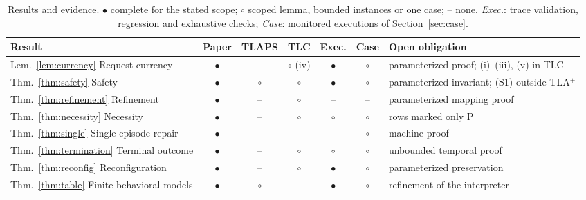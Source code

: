 \documentclass[pdflatex,sn-mathphys-num]{sn-jnl}
\theoremstyle{thmstyleone}%
\theoremstyle{thmstyletwo}%
\theoremstyle{thmstylethree}%
\newcommand{\tla}{TLA$^+$}
\begin{document}
\begin{table}[!ht]
\caption{Results and evidence. $\bullet$ complete for the stated scope; $\circ$ scoped lemma, bounded instances or one case; -- none. \emph{Exec.}: trace validation, regression and exhaustive checks; \emph{Case}: monitored executions of Section~\ref{sec:case}.}\label{tab:evidence}
\footnotesize\setlength{\tabcolsep}{4pt}
\begin{tabular}{@{}lcccccP{33mm}@{}}\toprule
Result & Paper & TLAPS & TLC & Exec. & Case & Open obligation\\\midrule
Lem.~\ref{lem:currency} Request currency & $\bullet$ & -- & $\circ$ (iv) & $\bullet$ & $\circ$ & parameterized proof; (i)--(iii), (v) in TLC\\
Thm.~\ref{thm:safety} Safety & $\bullet$ & $\circ$ & $\circ$ & $\bullet$ & $\circ$ & parameterized invariant; (S1) outside \tla{}\\
Thm.~\ref{thm:refinement} Refinement & $\bullet$ & -- & $\circ$ & -- & -- & parameterized mapping proof\\
Thm.~\ref{thm:necessity} Necessity & $\bullet$ & -- & $\circ$ & $\circ$ & $\circ$ & rows marked only P\\
Thm.~\ref{thm:single} Single-episode repair & $\bullet$ & -- & -- & -- & $\circ$ & machine proof\\
Thm.~\ref{thm:termination} Terminal outcome & $\bullet$ & -- & $\circ$ & $\circ$ & $\circ$ & unbounded temporal proof\\
Thm.~\ref{thm:reconfig} Reconfiguration & $\bullet$ & -- & $\circ$ & $\bullet$ & $\circ$ & parameterized preservation\\
Thm.~\ref{thm:table} Finite behavioral models & $\bullet$ & $\circ$ & -- & $\bullet$ & $\circ$ & refinement of the interpreter\\\bottomrule
\end{tabular}
\end{table}
\end{document}
